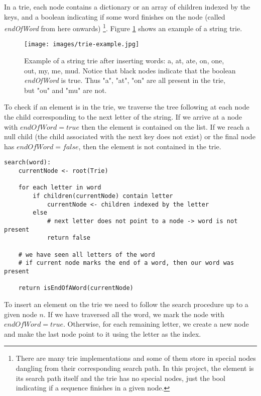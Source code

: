 \documentclass[a4paper,10pt,table,xcdraw]{article}
\begin{document}
In a trie, each node contains a dictionary or an array of children indexed by the keys, and a boolean indicating if some word finishes on the node (called \textit{endOfWord} from here onwards) \footnote{ There are many trie implementations and some of them store in special nodes dangling from their corresponding search path. In this project, the element is its search path itself and the trie has no special nodes, just the bool indicating if a sequence finishes in a given node.}. Figure \ref{fig:trie-example} shows an example of a string trie.

\begin{figure}[H]
\centering
\texttt{[image: images/trie-example.jpg]}
\caption{Example of a string trie after inserting words: a, at, ate, on, one, out, my, me, mud. Notice that black nodes indicate that the boolean \textit{endOfWord} is true. Thus "a", "at", "on" are all present in the trie, but "ou" and "mu" are not.}
\label{fig:trie-example}
\end{figure}


To check if an element is in the trie, we traverse the tree following at each node the child corresponding to the next letter of the string. If we arrive at a node with $endOfWord=true$ then the element is contained on the list. If we reach a null child (the child associated with the next key does not exist) or the final node has $endOfWord=false$, then the element is not contained in the trie.

\begin{verbatim}
search(word):
    currentNode <- root(Trie)
    
    for each letter in word
        if children(currentNode) contain letter
            currentNode <- children indexed by the letter
        else
            # next letter does not point to a node -> word is not present
            return false    
    
    # we have seen all letters of the word
    # if current node marks the end of a word, then our word was present
    
    return isEndOfAWord(currentNode)

\end{verbatim}


To insert an element on the trie we need to follow the search procedure up to a given node $n$. If we have traversed all the word, we mark the node with $endOfWord=true$. Otherwise, for each remaining letter, we create a new node and make the last node point to it using the letter as the index.
\end{document}
